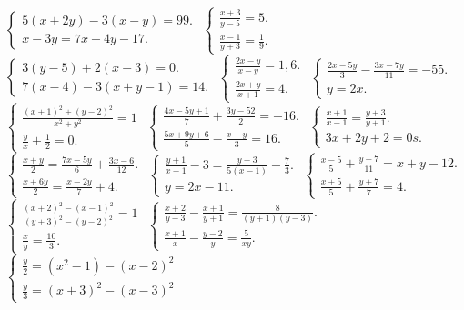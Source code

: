\begin{itemize}
\begin{itemize}
\it $\begin{cases}5(x+2y)-3(x-y)=99. \\x-3y=7x-4y-17
 .\end{cases}$
\it $\begin{cases} \frac{x+3}{y-5}=5.\\ \frac{x-1}{y+3}=\frac19.\end{cases}$
\it $\begin{cases} 3(y-5)+2(x-3)=0.\\7(x-4)-3(x+y-1)=14.\end{cases}$
\it $\begin{cases} \frac{2x-y}{x-y}=1,6.\\ \frac{2x+y}{x+1}=4.\end{cases}$
\it $\begin{cases} \frac{2x-5y}3-\frac{3x-7y}{11}=-55.\\y=2x.\end{cases}$
\it $\begin{cases} \frac{(x+1)^2+(y-2)^2}{x^2+y^2}=1 \\
\frac{y}x+\frac12=0.\end{cases}$
\it $\begin{cases} \frac{4x-5y+1}7+\frac{3y-52}2=-16.\\
\frac{5x+9y+6}5-\frac{x+y}3=16.\end{cases}$
\it $\begin{cases} \frac{x+1}{x-1}=\frac{y+3}{y+1}.\\
3x+2y+2=0s.\end{cases}$
\it $\begin{cases} \frac{x+y}2=\frac{7x-5y}6+\frac{3x-6}{12}.\\\frac{x+6y}2=\frac{x-2y}7+4.\end{cases}$
\it $\begin{cases} \frac{y+1}{x-1}-3=\frac{y-3}{5(x-1)}-\frac73. \\ y=2x-11.\end{cases}$
\it $\begin{cases} \frac{x-5}5 + \frac{y-7}{11}=x+y-12. \\ \frac{x+5}5+\frac{y+7}7=4.\end{cases}$
\it $\begin{cases} \frac{(x+2)^2-(x-1)^2}{(y+3)^2-(y-2)^2}=1 \\ \frac{x}y=\frac{10}3.\end{cases}$
\it $\begin{cases}\frac{x+2}{y-3}-\frac{x+1}{y+1}=\frac8{(y+1)(y-3)}. \\ \frac{x+1}x-\frac{y-2}y=\frac5{xy}.\end{cases}$
\it $\begin{cases}\frac{y}2=(x^2-1)-(x-2)^2 \\
\frac{y}3=(x+3)^2-(x-3)^2 \end{cases}$
\end{itemize}
\end{itemize}